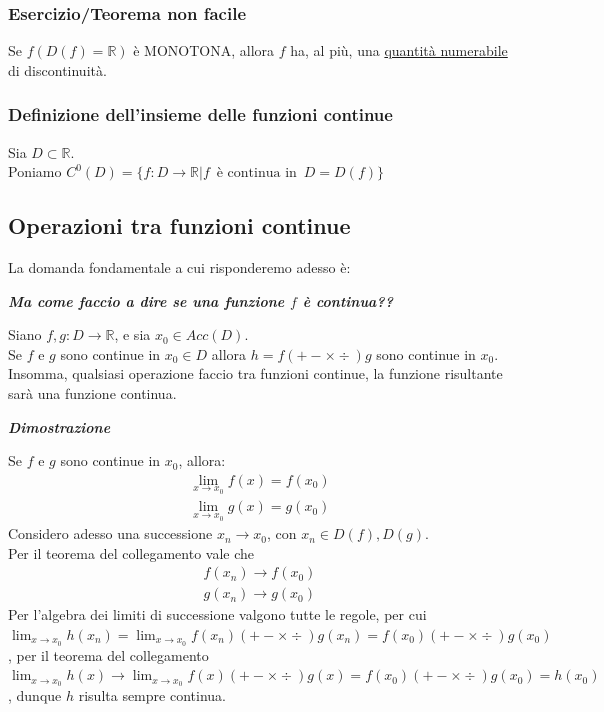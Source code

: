 \documentclass{article}
\theoremstyle{definition}
\begin{document}
\subsubsection{Esercizio/Teorema non facile}
Se $f(D(f)=\mathbb{R})$ è MONOTONA, allora $f$ ha, al più, una \underline{quantità numerabile} di discontinuità.
\subsubsection{Definizione dell'insieme delle funzioni continue}
Sia $D \subset \mathbb{R}$.
\\
Poniamo $C^0(D)=\{f: D \to \mathbb{R} | f \,\,\, \mbox{è continua in} \,\,\, D=D(f)\}$
\subsection{Operazioni tra funzioni continue}
La domanda fondamentale a cui risponderemo adesso è:
\begin{center}
    \textbf{\textit{Ma come faccio a dire se una funzione $f$ è continua??}}
\end{center}
Siano $f,g : D \to \mathbb{R}$, e sia $x_0 \in Acc(D)$.
\\
Se $f$ e $g$ sono continue in $x_0 \in D$ allora $h=f (+-\times\div)g$ sono continue in $x_0$.
\\
Insomma, qualsiasi operazione faccio tra funzioni continue, la funzione risultante sarà una funzione continua.
\begin{center}
    \textbf{\textit{Dimostrazione}}
\end{center}
Se $f$ e $g$ sono continue in $x_0$, allora:
\begin{align}
    \lim_{x \to x_0}f(x)= f(x_0) \\
    \lim_{x \to x_0}g(x)=g(x_0)
\end{align}
Considero adesso una successione $x_n \to x_0$, con $x_n \in D(f),D(g)$.
\\
Per il teorema del collegamento vale che
\begin{align}
    f(x_n) \to f(x_0) \\
    g(x_n) \to g(x_0)
\end{align}
Per l'algebra dei limiti di successione valgono tutte le regole, per cui $\lim_{x \to x_0} h(x_n) = \lim_{x \to x_0} f(x_n) (+- \times \div) g(x_n)= f(x_0) (+-\times \div) g(x_0)$, per il teorema del collegamento $\lim_{x \to x_0}h(x) \to \lim_{x \to x_0} f(x)(+-\times \div)g(x)= f(x_0) (+- \times \div) g(x_0) = h(x_0)$, dunque $h$ risulta sempre continua.
\end{document}
